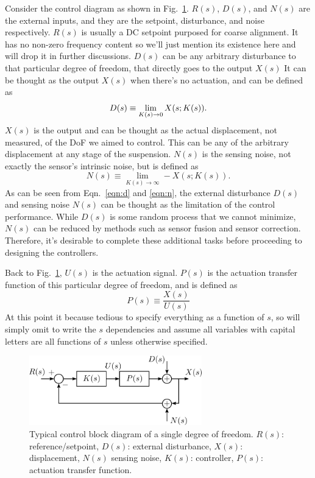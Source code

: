 Consider the control diagram as shown in Fig.~\ref{fig:generalcontrolblockdiagram}.
$R(s)$, $D(s)$, and $N(s)$ are the external inputs, and they are the setpoint, disturbance, and noise respectively.
$R(s)$ is usually a DC setpoint purposed for coarse alignment.
It has no non-zero frequency content so we'll just mention its existence here and will drop it in further discussions.
$D(s)$ can be any arbitrary disturbance to that particular degree of freedom, that directly goes to the output $X(s)$
It can be thought as the output $X(s)$ when there's no actuation, and can be defined as
\begin{equation}
	D(s) \equiv \lim_{K(s)\to 0} X\mleft(s;K(s)\mright).
	\label{eqn:d}
\end{equation}
$X(s)$ is the output and can be thought as the actual displacement, not measured, of the DoF we aimed to control.
This can be any of the arbitrary displacement at any stage of the suspension.
$N(s)$ is the sensing noise, not exactly the sensor's intrinsic noise, but is defined as
\begin{equation}
	N(s) \equiv \lim_{K(s)\to\infty} -X(s;K(s)).
	\label{eqn:n}
\end{equation}
As can be seen from Eqn.~\eqref{eqn:d} and \eqref{eqn:n}, the external disturbance $D(s)$ and sensing noise $N(s)$ can be thought as the limitation of the control performance.
While $D(s)$ is some random process that we cannot minimize, $N(s)$ can be reduced by methods such as sensor fusion and sensor correction.
Therefore, it's desirable to complete these additional tasks before proceeding to designing the controllers.

Back to Fig.~\ref{fig:generalcontrolblockdiagram}, $U(s)$ is the actuation signal.
$P(s)$ is the actuation transfer function of this particular degree of freedom, and is defined as
\begin{equation}
	P(s) \equiv \frac{X(s)}{U(s)}
\end{equation}
At this point it because tedious to specify everything as a function of $s$, so will simply omit to write the $s$ dependencies and assume all variables with capital letters are all functions of $s$ unless otherwise specified.
\begin{figure}[!h]
	\centering
	\includegraphics[width=75mm]{figures/general_control_block_diagram}
	\caption{Typical control block diagram of a single degree of freedom. $R(s)$: reference/setpoint, $D(s)$: external disturbance, $X(s)$: displacement, $N(s)$ sensing noise, $K(s)$: controller, $P(s)$: actuation transfer function.}
	\label{fig:generalcontrolblockdiagram}
\end{figure}

